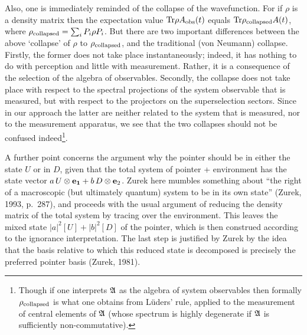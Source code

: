 \documentclass[12pt,titlepage]{article}
\newcommand{\rh}{\rho}
\newcommand{\A}{\frak A}
\newcommand{\fn}{\footnote}
\newcommand{\ot}{\otimes}
\begin{document}
Also, one is immediately reminded of the collapse of the wavefunction. For if
$\rh$ is a density
matrix then the expectation value ${\rm Tr} \rh A_{\rm obs}(t)$ equals ${\rm
Tr} \rh_{\rm collapsed}
A(t)$, where $\rh_{\rm collapsed}=\sum_i P_i \rh P_i$. But there are two
important differences between
the above `collapse' of $\rh$ to $\rh_{\rm collapsed}$, and the traditional
(von Neumann) collapse.
Firstly, the former does not take place instantaneously; indeed, it has nothing
to do with
perception and little with measurement. Rather, it is a consequence of the
selection of the algebra
of observables. Secondly, the collapse does not take place with respect to the
spectral projections
of the system observable that is measured, but with respect to the projectors
on the superselection
sectors. Since in our approach the latter are neither related to the system
that is measured, nor to
the measurement apparatus, we see that the two collapses should not be confused
indeed\fn{Though if
one interprets $\A$ as the algebra of system observables then  formally
$\rh_{\rm collapsed}$ is what
one obtains from L\"{u}ders' rule, applied to the measurement of central
elements of $\A$
(whose spectrum is highly degenerate if $\A$ is sufficiently
non-commutative).}.


A further point concerns the argument why the pointer should be in either the
state $U$ or in $D$,
given that the total system of pointer + environment has the state vector $a\,
U\ot {\bf e_1}+ b\,
D\ot {\bf e}_2$. Zurek here mumbles something about ``the right of a
macroscopic (but ultimately
quantum) system to be in its own state''  (Zurek, 1993, p.\ 287), and proceeds
with the usual argument
of reducing the density matrix of the total system by tracing over the
environment. This leaves the
mixed state $|a|^2 [U]+|b|^2 [D]$ of the pointer, which is then construed
according to the
ignorance interpretation. The last step is justified by Zurek by the idea that
the basis relative to
which this reduced state is decomposed is precisely the preferred pointer basis
(Zurek, 1981).
\end{document}
